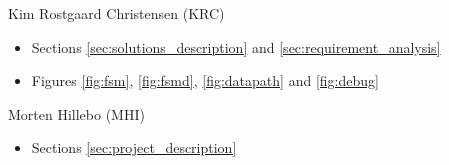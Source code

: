 Kim Rostgaard Christensen (KRC)
\begin{itemize}
\item Sections \ref{sec:solutions_description} and \ref{sec:requirement_analysis}
\item Figures \ref{fig:fsm}, \ref{fig:fsmd}, \ref{fig:datapath} and \ref{fig:debug}
\end{itemize}

Morten Hillebo (MHI) 
\begin{itemize}
\item Sections \ref{sec:project_description}
\end{itemize}
